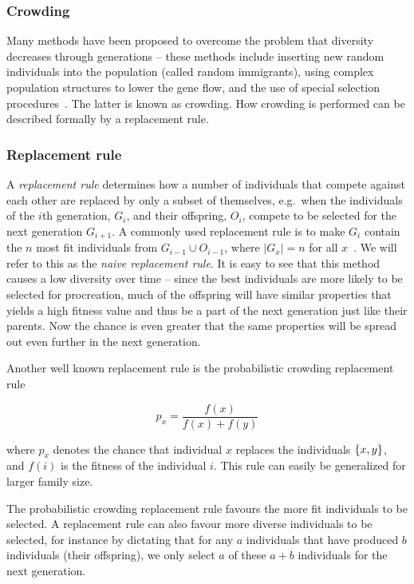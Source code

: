\subsubsection{Crowding}
Many methods have been proposed to overcome the problem that diversity decreases through generations -- these methods include inserting new random individuals into the population (called random immigrants), using complex population structures to lower the gene flow, and the use of special selection procedures~\cite{ursem2002diversity}. The latter is known as crowding.  How crowding is performed can be described formally by a replacement rule.

\subsubsection{Replacement rule}
A \emph{replacement rule} determines how a number of individuals that compete against each other are replaced by only a subset of themselves, e.g.\ when the individuals of the $i$th generation, $G_i$, and their offspring, $O_i$, compete to be selected for the next generation $G_{i+1}$. A commonly used replacement rule is to make $G_i$ contain the $n$ most fit individuals from $G_{i-1} \cup O_{i-1}$, where $|G_x| = n$ for all $x$~\cite{masterThesisGANN}. We will refer to this as the \emph{naive replacement rule}. It is easy to see that this method causes a low diversity over time -- since the best individuals are more likely to be selected for procreation, much of the offspring will have similar properties that yields a high fitness value and thus be a part of the next generation just like their parents. Now the chance is even greater that the same properties will be spread out even further in the next generation.

Another well known replacement rule is the probabilistic crowding replacement rule~\cite{Mengshoel_and_Goldberg:1999}

\[p_x = \frac{f(x)}{f(x)+f(y)}\]

where $p_x$ denotes the chance that individual $x$ replaces the individuals $\{ x, y \}$, and $f(i)$ is the fitness of the individual $i$. This rule can easily be generalized for larger family size. 

The probabilistic crowding replacement rule favours the more fit individuals to be selected. A replacement rule can also favour more diverse individuals to be selected, for instance by dictating that for any $a$ individuals that have produced $b$ individuals (their offspring), we only select $a$ of these $a + b$ individuals for the next generation.


